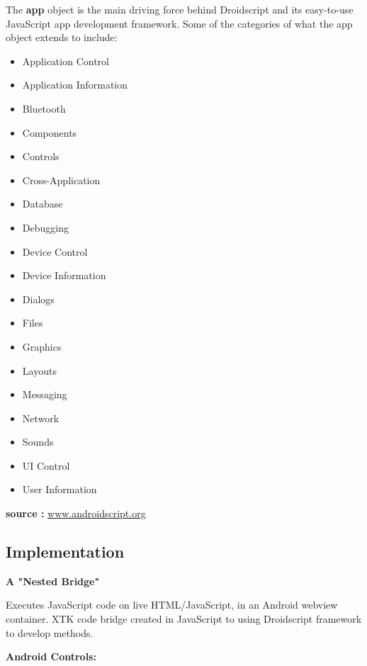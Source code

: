 \documentclass[sigconf]{acmart}
\begin{document}
\vspace{0.09 cm}
The \textbf{app} object is the main driving force behind Droidscript and its easy-to-use JavaScript app development framework. Some of the categories of what the app object extends to include:
\begin{itemize}
\item Application Control
\item Application Information
\item Bluetooth
\item Components
\item Controls
\item Cross-Application
\item Database
\item Debugging
\item Device Control
\item Device Information
\item Dialogs
\item Files
\item Graphics
\item Layouts
\item Messaging
\item Network
\item Sounds
\item UI Control
\item User Information
\end{itemize}

\textbf{source : }\hyperlink{www.androidscript.org}{www.androidscript.org}

\subsection{Implementation}
\textbf{A "Nested Bridge"}
\vspace{0.09 cm}

\vspace{0.09 cm}

\vspace{0.18 cm}
Executes JavaScript code on live HTML/JavaScript, in an Android webview container. XTK code bridge created in JavaScript to using Droidscript framework to develop methods.
\vspace{0.09 cm}

\textbf{Android Controls: }
\end{document}
